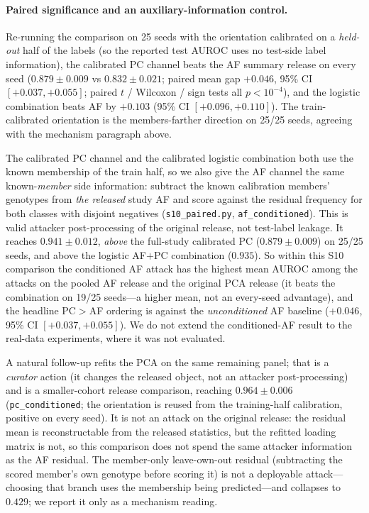 \documentclass[11pt]{article}
\begin{document}
\paragraph{Paired significance and an auxiliary-information control.} Re-running
the comparison on 25 seeds with the
orientation calibrated on a \emph{held-out} half of the labels (so the reported
test AUROC uses no test-side label information), the calibrated PC channel beats
the AF summary release on every seed ($0.879 \pm 0.009$ vs $0.832 \pm 0.021$;
paired mean gap $+0.046$, 95\% CI $[+0.037,+0.055]$; paired $t$ / Wilcoxon /
sign tests all $p<10^{-4}$), and the logistic combination beats AF by $+0.103$
(95\% CI $[+0.096,+0.110]$). The train-calibrated orientation is the
members-farther direction on 25/25 seeds, agreeing with the mechanism paragraph
above.

The calibrated PC channel and the calibrated logistic combination both use the
known membership of the train half, so we also give the AF channel the same
known-\emph{member} side information: subtract the known calibration members'
genotypes from \emph{the released} study AF and score against the residual
frequency for both classes with disjoint negatives (\texttt{s10\_paired.py},
\texttt{af\_conditioned}). This is valid attacker post-processing of the original
release, not test-label leakage. It reaches $0.941 \pm 0.012$, \emph{above} the
full-study calibrated PC ($0.879 \pm 0.009$) on 25/25 seeds, and above the
logistic AF$+$PC combination ($0.935$). So within this S10 comparison the
conditioned AF attack has the highest mean AUROC among the attacks on the pooled
AF release and the original PCA release (it beats the combination on 19/25
seeds---a higher mean, not an every-seed advantage), and the
headline PC$>$AF ordering is against the \emph{unconditioned} AF baseline
($+0.046$, 95\% CI $[+0.037,+0.055]$). We do not extend the conditioned-AF
result to the real-data experiments, where it was not evaluated.

A natural follow-up refits the PCA on the same remaining panel; that is a
\emph{curator} action (it changes the released object, not an attacker
post-processing) and is a smaller-cohort release comparison, reaching
$0.964 \pm 0.006$ (\texttt{pc\_conditioned}; the orientation is reused from the
training-half calibration, positive on every seed). It is not an attack on the original
release: the residual mean is reconstructable from the released statistics, but
the refitted loading matrix is not, so this comparison does not spend the same
attacker information as the AF residual. The member-only leave-own-out residual
(subtracting the scored member's own genotype before scoring it) is not a
deployable attack---choosing that branch uses the membership being
predicted---and collapses to $0.429$; we report it only as a mechanism reading.
\end{document}
